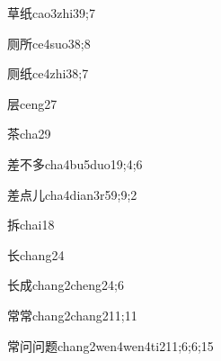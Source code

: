 \begin{verbete}{草纸}{cao3zhi3}{9;7}
\end{verbete}

\begin{verbete}{厕所}{ce4suo3}{8;8}
\end{verbete}

\begin{verbete}{厕纸}{ce4zhi3}{8;7}
\end{verbete}

\begin{verbete}{层}{ceng2}{7}
\end{verbete}

\begin{verbete}{茶}{cha2}{9}
\end{verbete}

\begin{verbete}{差不多}{cha4bu5duo1}{9;4;6}
\end{verbete}

\begin{verbete}{差点儿}{cha4dian3r5}{9;9;2}
\end{verbete}

\begin{verbete}{拆}{chai1}{8}
\end{verbete}

\begin{verbete}{长}{chang2}{4}
\end{verbete}

\begin{verbete}{长成}{chang2cheng2}{4;6}
\end{verbete}

\begin{verbete}{常常}{chang2chang2}{11;11}
\end{verbete}

\begin{verbete}{常问问题}{chang2wen4wen4ti2}{11;6;6;15}
\end{verbete}

